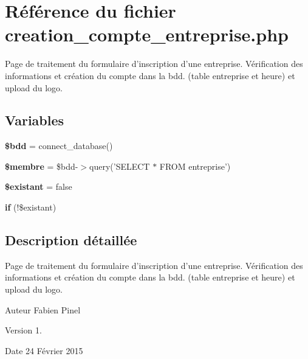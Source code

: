 \hypertarget{creation__compte__entreprise_8php}{\section{Référence du fichier creation\-\_\-compte\-\_\-entreprise.\-php}
\label{creation__compte__entreprise_8php}
}


Page de traitement du formulaire d'inscription d'une entreprise. Vérification des informations et création du compte dans la bdd. (table entreprise et heure) et upload du logo.  


\subsection*{Variables}
\begin{DoxyCompactItemize}
\item 
\hypertarget{creation__compte__entreprise_8php_a94f91e878bce0991e2cd595c5dd79b3f}{{\bfseries \$bdd} = connect\-\_\-database()}\label{creation__compte__entreprise_8php_a94f91e878bce0991e2cd595c5dd79b3f}

\item 
\hypertarget{creation__compte__entreprise_8php_aa000a46a528298c316b1fdf788402a63}{{\bfseries \$membre} = \$bdd-\/$>$query('S\-E\-L\-E\-C\-T $\ast$ F\-R\-O\-M entreprise')}\label{creation__compte__entreprise_8php_aa000a46a528298c316b1fdf788402a63}

\item 
\hypertarget{creation__compte__entreprise_8php_a3289caad8efe0a8b4dffdfc5d252d16f}{{\bfseries \$existant} = false}\label{creation__compte__entreprise_8php_a3289caad8efe0a8b4dffdfc5d252d16f}

\item 
{\bfseries if} (!\$existant)
\end{DoxyCompactItemize}


\subsection{Description détaillée}
Page de traitement du formulaire d'inscription d'une entreprise. Vérification des informations et création du compte dans la bdd. (table entreprise et heure) et upload du logo. \begin{DoxyAuthor}{Auteur}
Fabien Pinel 
\end{DoxyAuthor}
\begin{DoxyVersion}{Version}
1. 
\end{DoxyVersion}
\begin{DoxyDate}{Date}
24 Février 2015 
\end{DoxyDate}


